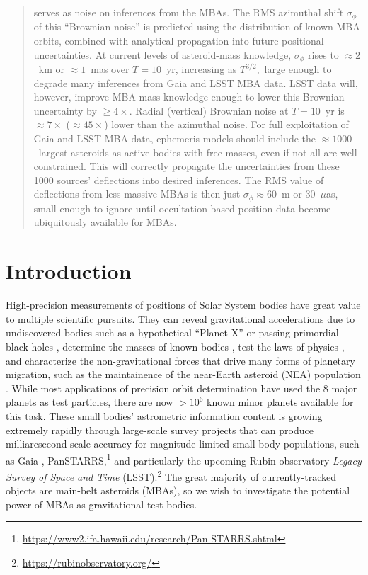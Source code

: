 \documentclass[linenumbers, onecolumn]{aastex631}
\newcommand{\eg}{\textit{e.g.\/}}
\begin{document}
\begin{abstract}
serves as noise on inferences from the MBAs.  The RMS
azimuthal shift $\sigma_\phi$ of this ``Brownian noise''  is predicted
using the distribution of known MBA orbits, combined with analytical propagation
into future positional uncertainties. At current
levels of asteroid-mass knowledge, $\sigma_\phi$ rises to
$\approx2$~km or $\approx1$~mas over $T=10$~yr, increasing as
$T^{3/2},$  large enough to degrade many inferences from
Gaia and LSST MBA data. LSST data will, however, improve MBA
mass knowledge enough to lower this Brownian uncertainty by
$\ge4\times.$  Radial (vertical) Brownian noise  at $T=10$~yr is
$\approx7\times$ ($\approx45\times$) 
lower than the azimuthal noise.  For full exploitation of Gaia and
LSST MBA data, ephemeris models should include the
$\approx1000$~largest asteroids as active bodies with free masses,
even if not all are well constrained.  This will correctly propagate
the uncertainties from these 1000 sources' deflections into desired
inferences. The RMS value of deflections from less-massive MBAs is
then just $\sigma_\phi\approx60$~m or 30~$\mu$as, small enough to ignore until occultation-based position data become ubiquitously available for MBAs.
\end{abstract}


\section{Introduction}

High-precision measurements of positions of Solar System bodies have
great value to multiple scientific pursuits.  They can reveal
gravitational accelerations due to undiscovered bodies such as a
hypothetical ``Planet X'' \citep[\eg][]{holmanP9,inpopP9,trojans,occultations} or passing primordial
black holes \citep[\eg][]{pbh}, determine
the masses of known bodies \citep[\eg][]{goffin,baer}, test the laws
of physics \citep[\eg][]{inpopgraviton}, and characterize 
the non-gravitational forces that drive many forms of planetary
migration, such as the maintainence of the near-Earth asteroid (NEA)
population \citep[reviewed by][]{yarkovsky}.  While most applications of precision orbit determination
have used the 8 major planets as test particles, there are now $>10^6$
known minor planets available for this task.  These small bodies' astrometric
information content is growing extremely rapidly through large-scale
survey projects that can produce
milliarcsecond-scale accuracy for magnitude-limited small-body populations, such as Gaia \citep{gaiass3,gaiafpr},
PanSTARRS,\footnote{\url{https://www2.ifa.hawaii.edu/research/Pan-STARRS.shtml}}
and particularly the upcoming Rubin observatory
\textit{Legacy Survey of Space and Time} (LSST).\footnote{\url{https://rubinobservatory.org/}}  The great majority
of currently-tracked objects are main-belt asteroids (MBAs), so we
wish to investigate the potential power of MBAs as gravitational test
bodies.
\end{document}
